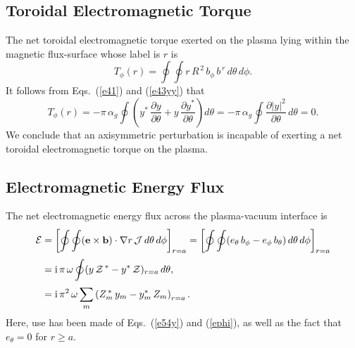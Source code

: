 \documentclass[12pt,prb,aps,notitlepage]{revtex4-1}
\begin{document}
\subsection{Toroidal Electromagnetic Torque}\label{storque}
The net toroidal electromagnetic torque exerted on the plasma lying within the magnetic flux-surface whose label is $r$ is
\begin{equation}
T_\phi(r)= \oint\oint r\,R^{\,2}\,b_\phi\,b^{\,r}\,d\theta\,d\phi.
\end{equation}
It follows from Eqs.~(\ref{e41}) and (\ref{e43yy}) that 
\begin{equation}
T_\phi(r) = -\pi\,\alpha_g\oint\left(y^\ast\,\frac{\partial y}{\partial\theta}+y\,\frac{\partial y^\ast}{\partial\theta}\right)d\theta
= -\pi\,\alpha_g\oint\frac{\partial|y|^2}{\partial\theta}\,d\theta = 0.
\end{equation}
We conclude that an axisymmetric perturbation is incapable of exerting a net toroidal electromagnetic torque on the plasma. 

\subsection{Electromagnetic Energy Flux}
The net electromagnetic energy flux across the plasma-vacuum interface is 
\begin{align}\label{eflux}
{\cal E} &= \left[\oint\oint ({\bf e}\times {\bf b})\cdot\nabla r\,{\cal J}\,d\theta\,d\phi\right]_{r=a}= \left[\oint\oint (e_\theta\,b_\phi-e_\phi\,b_\theta)\,d\theta\,d\phi\right]_{r=a}\nonumber\\[0.5ex]
&={\rm i}\,\pi\,\omega\oint (y\,{\cal Z}^{\,\ast}-y^\ast \,{\cal Z})_{r=a}\,d\theta,\nonumber\\[0.5ex]
&={\rm i}\,\pi^2\,\omega \sum_{m}\left(Z_m^{\,\ast}\,y_m-y_m^\ast\,Z_m\right)_{r=a}.
\end{align}
Here, use has been made of Eqs.~(\ref{e54y}) and  (\ref{ephi}), as well as  the fact that $e_\theta=0$ for $r\geq a$. 
\end{document}
